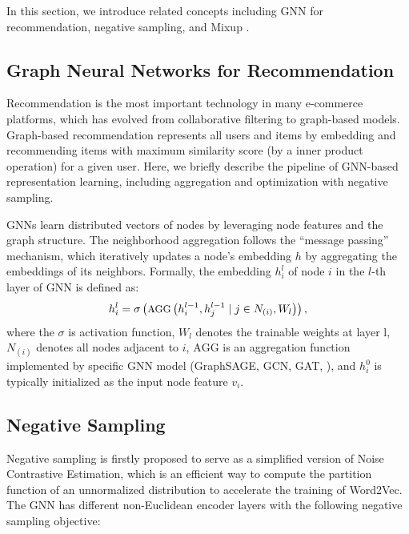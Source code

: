 In this section,  we introduce related concepts including GNN for recommendation, negative sampling, and Mixup \cite{mixup}.

\subsection{Graph Neural Networks for Recommendation}
 Recommendation is the most important technology in many e-commerce platforms, which has evolved from collaborative filtering to graph-based models. Graph-based recommendation represents all users and items by embedding and recommending items with maximum similarity score (by a inner product operation) for a given user. Here, we briefly describe the pipeline of GNN-based representation learning, including aggregation and optimization with negative sampling.

GNNs learn distributed vectors of nodes by leveraging node features and the graph structure. 
The neighborhood aggregation follows the ``message passing'' mechanism, which iteratively updates a node's embedding $h$ by aggregating the embeddings of its neighbors. Formally, the embedding $h_i^l$ of node $i$ in the $l$-th layer of GNN is defined as:
 \begin{equation} \label{agg}
     \small
     h_i^l= \sigma\left(\text{AGG}\left(h_{i}^{l-1}, h_{j}^{l-1} \mid j \in N_{(i)},W_l\right)\right),
 \end{equation}
where the \(\sigma\) is activation function, $W_l$ denotes the trainable weights at layer l, $N_{(i)}$ denotes all nodes adjacent to $i$, $\text{AGG}$ is an aggregation function implemented by specific GNN model (\eg GraphSAGE, GCN, GAT, \etc), and $h_i^0$ is typically initialized as the input node feature $v_i$.

 
\subsection{Negative Sampling}

Negative sampling \cite{negsamp} is firstly proposed to serve as a simplified version of Noise Contrastive Estimation\cite{NCE}, which is an efficient way to compute the partition function of an unnormalized distribution to accelerate the training of Word2Vec\cite{word2vec}. The GNN has different non-Euclidean encoder layers with the following negative sampling objective:

